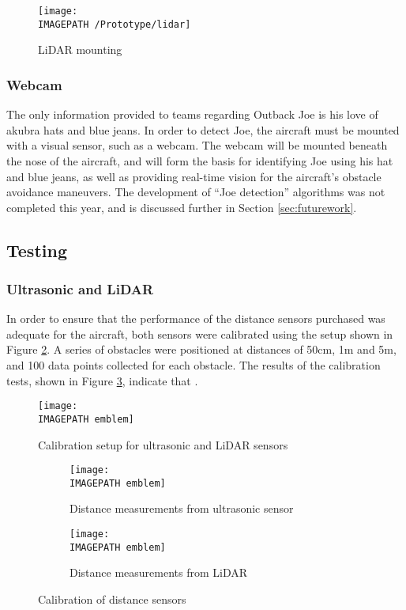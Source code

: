 \begin{figure}[!ht]
	\centering
	\texttt{[image: \\IMAGEPATH /Prototype/lidar]}
	\caption{LiDAR mounting}
	\label{fig:lidar}
\end{figure}

\subsubsection*{Webcam}
The only information provided to teams regarding Outback Joe is his love of akubra hats and blue jeans. In order to detect Joe, the aircraft must be mounted with a visual sensor, such as a webcam. The webcam will be mounted beneath the nose of the aircraft, and will form the basis for identifying Joe using his hat and blue jeans, as well as providing real-time vision for the aircraft's obstacle avoidance maneuvers. The development of ``Joe detection'' algorithms was not completed this year, and is discussed further in Section \ref{sec:futurework}.

\subsection{Testing}
\subsubsection*{Ultrasonic and LiDAR}
In order to ensure that the performance of the distance sensors purchased was adequate for the aircraft, both sensors were calibrated using the setup shown in Figure \ref{fig:sensortests}. A series of obstacles were positioned at distances of 50cm, 1m and 5m, and 100 data points collected for each obstacle. The results of the calibration tests, shown in Figure \ref{fig:sensortestresults},  indicate that .

\begin{figure}[!ht]
	\centering
	\texttt{[image: \\IMAGEPATH emblem]}
	\caption{Calibration setup for ultrasonic and LiDAR sensors}
	\label{fig:sensortests}
\end{figure}

\begin{figure}
	\centering
	\begin{subfigure}{0.4\textwidth}
		\centering
		\texttt{[image: \\IMAGEPATH emblem]}
		\caption{Distance measurements from ultrasonic sensor}
	\end{subfigure} %
	\begin{subfigure}{0.4\textwidth}
		\centering
		\texttt{[image: \\IMAGEPATH emblem]}
		\caption{Distance measurements from LiDAR}
	\end{subfigure}
	
	\caption{Calibration of distance sensors}
	\label{fig:sensortestresults}
\end{figure}
	
